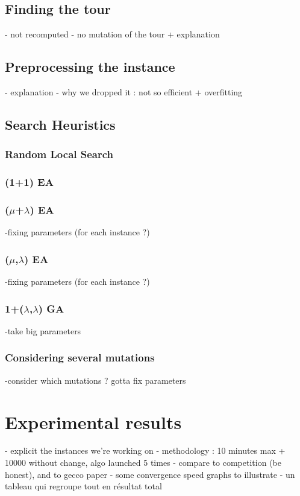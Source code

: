 \documentclass[a4paper]{article}
\begin{document}
\subsection{Finding the tour}
- not recomputed
- no mutation of the tour + explanation
\subsection{Preprocessing the instance}
- explanation
- why we dropped it : not so efficient + overfitting
\subsection{Search Heuristics}
\subsubsection{Random Local Search}
\subsubsection{(1+1) EA}
\subsubsection{($\mu$+$\lambda$) EA}
-fixing parameters (for each instance ?)
\subsubsection{($\mu$,$\lambda$) EA}
-fixing parameters (for each instance ?)
\subsubsection{1+($\lambda$,$\lambda$) GA}
-take big parameters
\subsubsection{Considering several mutations}
-consider which mutations ? gotta fix parameters
\section{Experimental results}
- explicit the instances we're working on
- methodology : 10 minutes max + 10000 without change, algo launched 5 times
- compare to competition (be honest), and to gecco paper
- some convergence speed graphs to illustrate
- un tableau qui regroupe tout en résultat total
\end{document}
